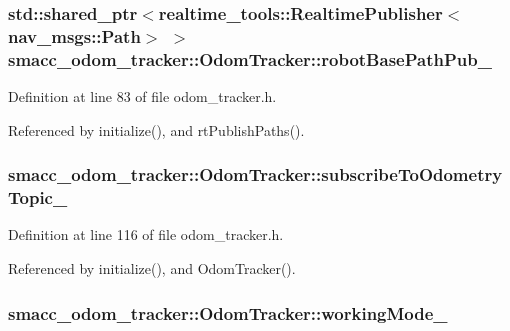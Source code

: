 \subsubsection[{\texorpdfstring{robot\+Base\+Path\+Pub\+\_\+}{robotBasePathPub_}}]{\setlength{\rightskip}{0pt plus 5cm}std\+::shared\+\_\+ptr$<$realtime\+\_\+tools\+::\+Realtime\+Publisher$<$nav\+\_\+msgs\+::\+Path$>$ $>$ smacc\+\_\+odom\+\_\+tracker\+::\+Odom\+Tracker\+::robot\+Base\+Path\+Pub\+\_\+\hspace{0.3cm}{\ttfamily [protected]}}\hypertarget{classsmacc__odom__tracker_1_1OdomTracker_a32d060919f2630e0695ce016c0563a3f}{}\label{classsmacc__odom__tracker_1_1OdomTracker_a32d060919f2630e0695ce016c0563a3f}


Definition at line 83 of file odom\+\_\+tracker.\+h.



Referenced by initialize(), and rt\+Publish\+Paths().

\subsubsection[{\texorpdfstring{subscribe\+To\+Odometry\+Topic\+\_\+}{subscribeToOdometryTopic_}}]{ smacc\+\_\+odom\+\_\+tracker\+::\+Odom\+Tracker\+::subscribe\+To\+Odometry\+Topic\+\_\+\hspace{0.3cm}{\ttfamily [protected]}}\hypertarget{classsmacc__odom__tracker_1_1OdomTracker_a394c4040c01f687c427d34c0ab50ba3e}{}\label{classsmacc__odom__tracker_1_1OdomTracker_a394c4040c01f687c427d34c0ab50ba3e}


Definition at line 116 of file odom\+\_\+tracker.\+h.



Referenced by initialize(), and Odom\+Tracker().

\subsubsection[{\texorpdfstring{working\+Mode\+\_\+}{workingMode_}}]{ smacc\+\_\+odom\+\_\+tracker\+::\+Odom\+Tracker\+::working\+Mode\+\_\+\hspace{0.3cm}{\ttfamily [protected]}}\hypertarget{classsmacc__odom__tracker_1_1OdomTracker_ad011432ae35a533fd61bae43179c3c36}{}\label{classsmacc__odom__tracker_1_1OdomTracker_ad011432ae35a533fd61bae43179c3c36}


